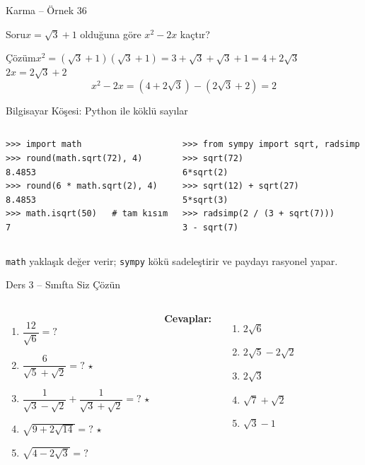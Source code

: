 \documentclass[aspectratio=169,11pt,handout]{beamer}
\newcommand{\soru}[3]{%
\begin{frame}{#1}
  \begin{block}{Soru}\large #2\end{block}
  \pause
  \begin{exampleblock}{Çözüm}\large #3\end{exampleblock}
\end{frame}}
\begin{document}
\soru{Karma -- Örnek 36}
{\(x=\sqrt3+1\) olduğuna göre \(x^2-2x\) kaçtır?}
{\(x^2=(\sqrt3+1)(\sqrt3+1)=3+\sqrt3+\sqrt3+1=4+2\sqrt3\)\\[3pt]
\(2x=2\sqrt3+2\)
\[x^2-2x=(4+2\sqrt3)-(2\sqrt3+2)=2\]}

\begin{frame}[fragile]{Bilgisayar Köşesi: Python ile köklü sayılar}
\begin{columns}[t]
\begin{verbatim}
>>> import math
>>> round(math.sqrt(72), 4)
8.4853
>>> round(6 * math.sqrt(2), 4)
8.4853
>>> math.isqrt(50)   # tam kısım
7
\end{verbatim}
\begin{verbatim}
>>> from sympy import sqrt, radsimp
>>> sqrt(72)
6*sqrt(2)
>>> sqrt(12) + sqrt(27)
5*sqrt(3)
>>> radsimp(2 / (3 + sqrt(7)))
3 - sqrt(7)
\end{verbatim}
\end{columns}
\small \verb|math| yaklaşık değer verir; \verb|sympy| kökü sadeleştirir ve paydayı rasyonel yapar.
\end{frame}

\begin{frame}{Ders 3 -- Sınıfta Siz Çözün}
\begin{columns}[t]
\begin{enumerate}
\item \(\dfrac{12}{\sqrt6}=?\)
\item \(\dfrac{6}{\sqrt5+\sqrt2}=?\) \(\star\)
\item \(\dfrac{1}{\sqrt3-\sqrt2}+\dfrac{1}{\sqrt3+\sqrt2}=?\) \(\star\)
\item \(\sqrt{9+2\sqrt{14}}=?\) \(\star\)
\item \(\sqrt{4-2\sqrt3}=?\)
\end{enumerate}
\pause
\textbf{Cevaplar:}
\begin{enumerate}
\item \(2\sqrt6\)
\item \(2\sqrt5-2\sqrt2\)
\item \(2\sqrt3\)
\item \(\sqrt7+\sqrt2\)
\item \(\sqrt3-1\)
\end{enumerate}
\end{columns}
\vspace{4pt}{\footnotesize \(\star\) işaretli soruların adım adım çözümü sonraki slaytlardadır.}
\end{frame}
\end{document}
